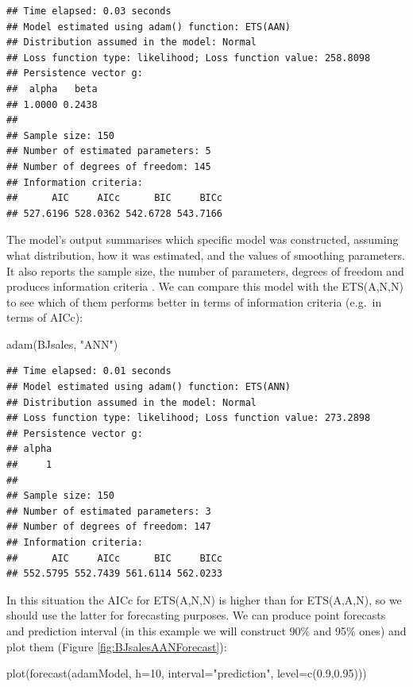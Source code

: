 \documentclass[
]{book}
\newenvironment{Shaded}{\begin{snugshade}}{\end{snugshade}}
\newcommand{\AttributeTok}[1]{\textcolor[rgb]{0.77,0.63,0.00}{#1}}
\newcommand{\DecValTok}[1]{\textcolor[rgb]{0.00,0.00,0.81}{#1}}
\newcommand{\FloatTok}[1]{\textcolor[rgb]{0.00,0.00,0.81}{#1}}
\newcommand{\FunctionTok}[1]{\textcolor[rgb]{0.00,0.00,0.00}{#1}}
\newcommand{\NormalTok}[1]{#1}
\newcommand{\StringTok}[1]{\textcolor[rgb]{0.31,0.60,0.02}{#1}}
\theoremstyle{definition}
\theoremstyle{definition}
\theoremstyle{definition}
\theoremstyle{definition}
\theoremstyle{remark}
\begin{document}
\begin{verbatim}
## Time elapsed: 0.03 seconds
## Model estimated using adam() function: ETS(AAN)
## Distribution assumed in the model: Normal
## Loss function type: likelihood; Loss function value: 258.8098
## Persistence vector g:
##  alpha   beta 
## 1.0000 0.2438 
## 
## Sample size: 150
## Number of estimated parameters: 5
## Number of degrees of freedom: 145
## Information criteria:
##      AIC     AICc      BIC     BICc 
## 527.6196 528.0362 542.6728 543.7166
\end{verbatim}

The model's output summarises which specific model was constructed, assuming what distribution, how it was estimated, and the values of smoothing parameters. It also reports the sample size, the number of parameters, degrees of freedom and produces information criteria \citep[see Section 13.4 of][]{SvetunkovSBA}. We can compare this model with the ETS(A,N,N) to see which of them performs better in terms of information criteria (e.g.~in terms of AICc):

\begin{Shaded}
\begin{Highlighting}[]
\FunctionTok{adam}\NormalTok{(BJsales, }\StringTok{"ANN"}\NormalTok{)}
\end{Highlighting}
\end{Shaded}

\begin{verbatim}
## Time elapsed: 0.01 seconds
## Model estimated using adam() function: ETS(ANN)
## Distribution assumed in the model: Normal
## Loss function type: likelihood; Loss function value: 273.2898
## Persistence vector g:
## alpha 
##     1 
## 
## Sample size: 150
## Number of estimated parameters: 3
## Number of degrees of freedom: 147
## Information criteria:
##      AIC     AICc      BIC     BICc 
## 552.5795 552.7439 561.6114 562.0233
\end{verbatim}

In this situation the AICc for ETS(A,N,N) is higher than for ETS(A,A,N), so we should use the latter for forecasting purposes. We can produce point forecasts and prediction interval (in this example we will construct 90\% and 95\% ones) and plot them (Figure \ref{fig:BJsalesAANForecast}):

\begin{Shaded}
\begin{Highlighting}[]
\FunctionTok{plot}\NormalTok{(}\FunctionTok{forecast}\NormalTok{(adamModel, }\AttributeTok{h=}\DecValTok{10}\NormalTok{,}
              \AttributeTok{interval=}\StringTok{"prediction"}\NormalTok{, }\AttributeTok{level=}\FunctionTok{c}\NormalTok{(}\FloatTok{0.9}\NormalTok{,}\FloatTok{0.95}\NormalTok{)))}
\end{Highlighting}
\end{Shaded}
\end{document}
